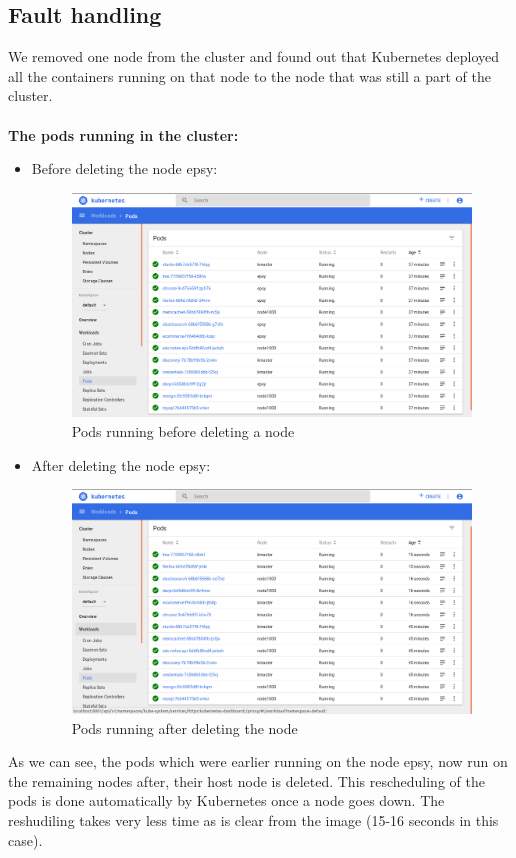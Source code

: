 \documentclass[12pt]{report}
\begin{document}
\subsection{Fault handling}
We removed one node from the cluster and found out that Kubernetes deployed all the containers running on that node to the node that was still a part of the cluster.\\\\
\textbf{The pods running in the cluster:}
\begin{itemize}
	\item Before deleting the node epsy: 
		\begin{figure}[h!]
			\begin{center}
				\includegraphics[totalheight=0.32\textheight]{podswithepsy}
				\caption{Pods running before deleting a node}
			\end{center}
		\end{figure}
	\item After deleting the node epsy:
		\begin{figure}[h!]
			\begin{center}
				\includegraphics[totalheight=0.32\textheight]{podswithoutepsy}
				\caption{Pods running after deleting the node}
			\end{center}
		\end{figure}
\end{itemize}
As we can see, the pods which were earlier running on the node epsy, now run on the remaining nodes after, their host node is deleted. This rescheduling of the pods is done automatically by Kubernetes once a node goes down. The reshudiling takes very less time as is clear from the image (15-16 seconds in this case). 
\end{document}
